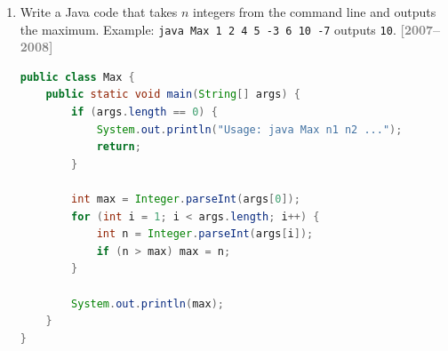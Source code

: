 \documentclass[12pt,a3paper]{article}
\newcommand{\yr}[1]{\hfill\textcolor{gray}{\small\textbf{[#1]}}}
\begin{document}
\begin{enumerate}
\begin{tcolorbox}[enhanced,breakable,ansbox,
  colback=cB!4,colframe=cB,boxrule=0.8pt,arc=5pt,
  title={\textbf{Answer — Jagged (Ragged) 2-D Array}},
  fonttitle=\bfseries\color{white},colbacktitle=cB]
\begin{lstlisting}[language=Java]
public class JaggedArray {
    public static void main(String[] args) {
        // Create a jagged array: row i has (4-i) columns
        int[][] arr = new int[4][];
        for (int i = 0; i < arr.length; i++)
            arr[i] = new int[4 - i];  // 4, 3, 2, 1 elements

        // All elements default to 0 — print to verify
        for (int i = 0; i < arr.length; i++) {
            for (int j = 0; j < arr[i].length; j++)
                System.out.print(arr[i][j] + " ");
            System.out.println();
        }
    }
}
\end{lstlisting}

\textbf{Output:}
\begin{verbatim}
0 0 0 0
0 0 0
0 0
0
\end{verbatim}

\textbf{Explanation:} In Java, a 2-D array is an
array of arrays. Allocating each row separately
(\texttt{arr[i] = new int[4-i]}) creates rows of
different lengths (a \emph{jagged} or \emph{ragged}
array). All \texttt{int} elements are automatically
initialised to 0.

\end{tcolorbox}


\item Write a Java code that takes $n$ integers from the command line and outputs the maximum. Example: \texttt{java Max 1 2 4 5 -3 6 10 -7} outputs \texttt{10}.
\yr{2007--2008}

\begin{tcolorbox}[enhanced,breakable,ansbox,
  colback=cB!4,colframe=cB,boxrule=0.8pt,arc=5pt,
  title={\textbf{Answer — Maximum of n Command-Line
  Integers}},
  fonttitle=\bfseries\color{white},colbacktitle=cB]

\begin{lstlisting}[language=Java]
public class Max {
    public static void main(String[] args) {
        if (args.length == 0) {
            System.out.println("Usage: java Max n1 n2 ...");
            return;
        }

        int max = Integer.parseInt(args[0]);
        for (int i = 1; i < args.length; i++) {
            int n = Integer.parseInt(args[i]);
            if (n > max) max = n;
        }

        System.out.println(max);
    }
}
\end{lstlisting}


\end{tcolorbox}
\end{enumerate}
\end{document}
